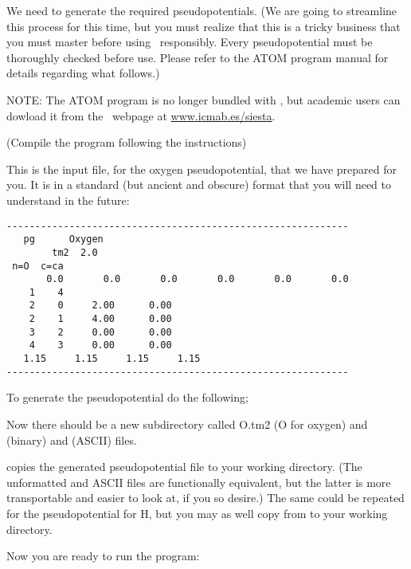\noindent
We need to generate the required pseudopotentials.
(We are going to streamline this process for this time, but
you must realize that this is a tricky business that you
must master before using \siesta\ responsibly. Every
pseudopotential must be thoroughly checked before use. Please refer to
the \textsc{ATOM} program manual for details regarding what follows.)

NOTE: The \textsc{ATOM} program is no longer bundled with \siesta,
but academic users can dowload it from the \siesta\ webpage at
\url{www.icmab.es/siesta}.


(Compile the program following the instructions)



\noindent
This is the input file, for the oxygen pseudopotential,
that we have prepared for you.
It is in a standard (but ancient and obscure) format that
you will need to understand in the future:
\begin{verbatim}
------------------------------------------------------------
   pg      Oxygen
        tm2  2.0
 n=O  c=ca
       0.0       0.0       0.0       0.0       0.0       0.0
    1    4
    2    0     2.00      0.00
    2    1     4.00      0.00
    3    2     0.00      0.00
    4    3     0.00      0.00
   1.15     1.15     1.15     1.15
------------------------------------------------------------
\end{verbatim}

To generate the pseudopotential do the following;


\noindent
Now there should be a new subdirectory called O.tm2 (O for oxygen)
and  (binary) and  (ASCII) files.


\noindent
copies the generated pseudopotential file to your working directory.
(The unformatted and ASCII files are functionally equivalent, but
the latter is more transportable and easier to look at, if you so
desire.) The same could be repeated for the pseudopotential for H,
but you may as well copy  from 
to your  working directory.

\noindent
Now you are ready to run the program:

